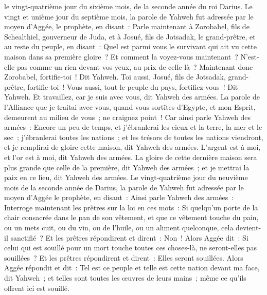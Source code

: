 \begin{multicols}{2}
le vingt-quatrième jour du sixième mois, de la seconde année du roi Darius.
\VerseOne{}Le vingt et unième jour du septième mois, la parole de Yahweh fut adressée par le moyen d'Aggée, le prophète, en disant~:
Parle maintenant à Zorobabel, fils de Schealthiel, gouverneur de Juda, et à Josué, fils de Jotsadak, le grand-prêtre, et au reste du peuple, en disant~:
Quel est parmi vous le survivant qui ait vu cette maison dans sa première gloire~? Et comment la voyez-vous maintenant~? N'est-elle pas comme un rien devant vos yeux, au prix de celle-là~?
Maintenant donc Zorobabel, fortifie-toi~! Dit Yahweh. Toi aussi, Josué, fils de Jotsadak, grand-prêtre, fortifie-toi~! Vous aussi, tout le peuple du pays, fortifiez-vous~! Dit Yahweh. Et travaillez, car je suis avec vous, dit Yahweh des armées.
La parole de l'Alliance que je traitai avec vous, quand vous sortîtes d'Egypte, et mon Esprit, demeurent au milieu de vous~; ne craignez point~!
Car ainsi parle Yahweh des armées~: Encore un peu de temps, et j'ébranlerai les cieux et la terre, la mer et le sec~;
j'ébranlerai toutes les nations~; et les trésors de toutes les nations viendront, et je remplirai de gloire cette maison, dit Yahweh des armées.
L'argent est à moi, et l'or est à moi, dit Yahweh des armées.
La gloire de cette dernière maison sera plus grande que celle de la première, dit Yahweh des armées~; et je mettrai la paix en ce lieu, dit Yahweh des armées.
Le vingt-quatrième jour du neuvième mois de la seconde année de Darius, la parole de Yahweh fut adressée par le moyen d'Aggée le prophète, en disant~:
Ainsi parle Yahweh des armées~: Interroge maintenant les prêtres sur la loi en ces mots~:
Si quelqu'un porte de la chair consacrée dans le pan de son vêtement, et que ce vêtement touche du pain, ou un mets cuit, ou du vin, ou de l'huile, ou un aliment quelconque, cela devient-il sanctifié~? Et les prêtres répondirent et dirent~: Non~!
Alors Aggée dit~: Si celui qui est souillé pour un mort touche toutes ces choses-là, ne seront-elles pas souillées~? Et les prêtres répondirent et dirent~: Elles seront souillées.
Alors Aggée répondit et dit~: Tel est ce peuple et telle est cette nation devant ma face, dit Yahweh~; et telles sont toutes les œuvres de leurs mains~; même ce qu'ils offrent ici est souillé.

\end{multicols}
